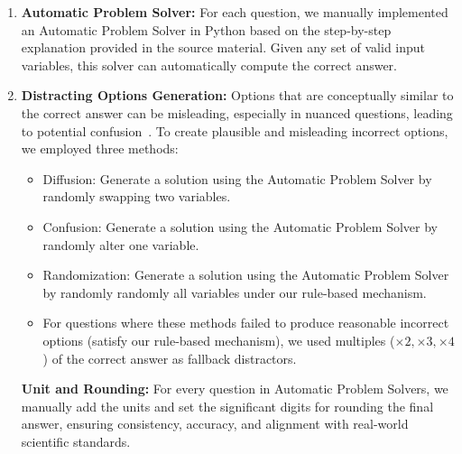 {\begin{enumerate}[topsep=5pt, leftmargin=1em]
    \item \textbf{Automatic Problem Solver:} For each question, we manually implemented an Automatic Problem Solver in Python based on the step-by-step explanation provided in the source material. Given any set of valid input variables, this solver can automatically compute the correct answer.
    
    \item \textbf{Distracting Options Generation:} 
    Options that are conceptually similar to the correct answer can be misleading, especially in nuanced questions, leading to potential confusion~\cite{yue2024mmmuprorobustmultidisciplinemultimodal}. To create plausible and misleading incorrect options, we employed three methods:
    \begin{itemize}[topsep=5pt, leftmargin=1em]
        \item Diffusion: Generate a solution using the Automatic Problem Solver by randomly swapping two variables.
        \item Confusion: Generate a solution using the Automatic Problem Solver by randomly alter one variable.
        \item Randomization: Generate a solution using the Automatic Problem Solver by randomly randomly all variables under our rule-based mechanism.
        \item For questions where these methods failed to produce reasonable incorrect options (satisfy our rule-based mechanism), we used multiples ($\times2, \times3, \times4$) of the correct answer as fallback distractors.
    \end{itemize}
    \textbf{Unit and Rounding:} For every question in Automatic Problem Solvers, we manually add the units and set the significant digits for rounding the final answer, ensuring consistency, accuracy, and alignment with real-world scientific standards.

\end{enumerate}
}
\fi


